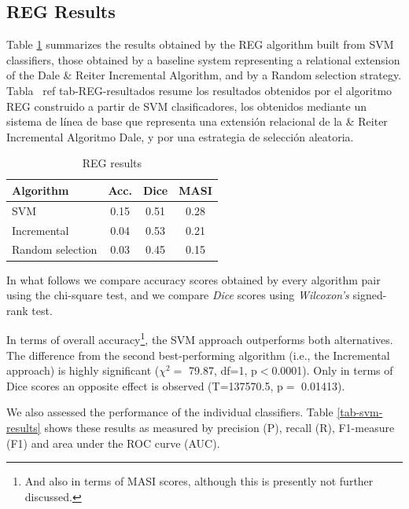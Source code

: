 \subsection{REG Results}

Table \ref{tab-reg-results} summarizes the results obtained by the REG algorithm built from SVM classifiers, those obtained by a baseline system representing a relational extension of the Dale \& Reiter Incremental Algorithm, and by a Random selection strategy.  
Tabla \ ref {tab-REG-resultados} resume los resultados obtenidos por el algoritmo REG construido a partir de SVM clasificadores, los obtenidos mediante un sistema de l\'{i}nea de base que representa una extensi\'on relacional de la \& Reiter Incremental Algoritmo Dale, y por una estrategia de selecci\'on aleatoria.

\begin{table}[ht]
\begin{center}
\caption{REG results}
\label{tab-reg-results}
\begin{tabular} {  l c c c }
\hline
{Algorithm}							& {Acc.} 	& { Dice}		& MASI \\ \hline 
SVM											& 0.15		& 0.51			& 0.28 \\
Incremental							& 0.04		& 0.53			& 0.21 \\
Random selection       	& 0.03    & 0.45      & 0.15 \\
\hline
\end{tabular}
\end{center}
\end{table}

In what follows we compare accuracy scores obtained by every algorithm pair using the chi-square test, and we compare {\em Dice} scores using {\em Wilcoxon's} signed-rank test.

In terms of overall accuracy\footnote{And also in terms of MASI scores, although this is presently not further discussed.}, the SVM approach outperforms both alternatives. The difference from the second best-performing algorithm (i.e., the Incremental approach) is highly significant ($\chi^{2}=$ 79.87, df=1, p$<$0.0001). Only in terms of Dice scores an opposite effect is observed (T=137570.5, p$=$ 0.01413). 

We also assessed the performance of the individual classifiers. Table \ref{tab-svm-results} shows these results as measured by precision (P), recall (R), F1-measure (F1) and area under the ROC curve (AUC). 


